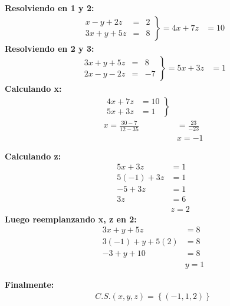 \documentclass[11pt, a4paper]{article}
\begin{document}
\begin{multicols}{2}
  \textbf{Resolviendo en 1 y 2:}
  \begin{align*}
    \left.
      \begin{array}{rcl}
        x-y+2z &= &2\\
        3x+y+5z &= &8
      \end{array}
    \right\} = 4x + 7z &= 10
  \end{align*}
  \textbf{Resolviendo en 2 y 3:}
  \begin{align*}
    \left.
      \begin{array}{rcl}
        3x+y+5z &= &8\\
        2x-y-2z &= &-7
      \end{array}
    \right\} = 5x + 3z &= 1
  \end{align*}
  \textbf{Calculando x:}
  \begin{align*}
    \left.
      \begin{array}{rcl}
        4x + 7z &= 10\\
        5x + 3z &= 1
      \end{array}
    \right\}\\
    x = \frac{30 - 7}{12 - 35} &= \frac{23}{-23}\\
    &\boxed{x = -1}
  \end{align*}

  \columnseprule=1pt 
  \columnbreak

  \textbf{Calculando z:}
  \begin{align*}
    5x + 3z &= 1\\
        5\left(-1\right) + 3z &= 1\\
        -5 + 3z &= 1\\
        3z &= 6\\
        &\boxed{z = 2}
  \end{align*}
  \textbf{Luego reemplanzando x, z en 2:}
  \begin{align*}
    3x+y+5z &= 8\\
    3\left(-1\right) + y + 5\left(2\right) &= 8\\
    -3 + y + 10 &= 8\\
    &\boxed{y = 1}
  \end{align*}
\end{multicols}
\textbf{Finalmente:}
\begin{align*}
  C.S. \left(x,y,z\right) = \left\{(-1, 1, 2)\right\}
\end{align*}
\end{document}
